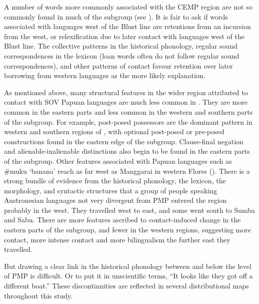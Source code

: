 A number of words more commonly associated with the CEMP region
are not so commonly found in much of the  subgroup (see ).
It is fair to ask if words associated with languages west of
the Blust line are retentions from an incursion from the west,
or relexification due to later contact with languages west of the Blust line.
The collective patterns in the historical phonology,
regular sound correspondences in the lexicon (loan words often
do not follow regular sound correspondences),
and other patterns of contact favour retention over later borrowing
from western languages as the more likely explanation.

As mentioned above, many structural features in the wider region
attributed to contact with SOV Papuan languages are much less common in .
They are more common in the eastern parts
and less common in the western
and southern parts of the subgroup.
For example, post-posed possessors are the dominant pattern in
western and southern regions of ,
with optional post-posed or pre-posed constructions found in
the eastern edge of the subgroup.
Clause-final negation and alienable-inalienable distinctions
also begin to be found in the eastern parts of the subgroup.
Other features associated with Papuan languages such as {\#}muku
‘banana’ reach as far west as Manggarai in western Flores
().
There is a strong bundle of evidence from the historical phonology,
the lexicon, the morphology,
and syntactic structures that a group of people speaking Austronesian
languages not very divergent from PMP entered the 
region probably in the west.
They travelled west to east,
and some went south to Sumba and Sabu.
There are more features ascribed to contact-induced change in
the eastern parts of the subgroup,
and fewer in the western regions,
suggesting more contact, more intense contact
and more bilingualism the further east they travelled.

But drawing a clear link in the historical phonology between
 and  below the level of PMP is difficult.
Or to put it in unscientific terms,
“It looks like they got off a different boat.” These discontinuities
are reflected in several distributional maps throughout this study.